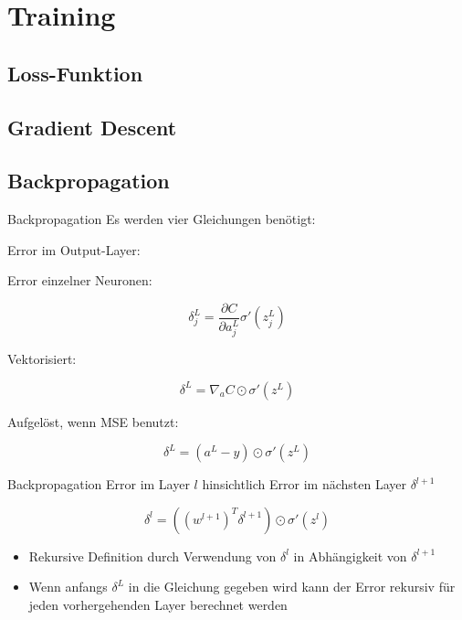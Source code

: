 \section{Training}%
\label{sec:train}

\subsection{Loss-Funktion}%
\label{sec:loss}



\subsection{Gradient Descent}%
\label{sec:graddesc}



\subsection{Backpropagation}%
\label{sec:backprop}

\begin{frame}{Backpropagation}
  Es werden vier Gleichungen benötigt:

  Error im Output-Layer:

  Error einzelner Neuronen:

  \[\delta_j^L = \frac{\partial C}{\partial a_j^L} \sigma' \left(z_j^L\right)\]

  Vektorisiert:

  \[\delta^L = \nabla_aC \odot \sigma'(z^L)\]

  Aufgelöst, wenn MSE benutzt:

  \[\delta^L = (a^L - y) \odot \sigma'(z^L)\]
\end{frame}

\begin{frame}{Backpropagation}
  Error im Layer \(l\) hinsichtlich Error im nächsten Layer \(\delta^{l+1}\)

  \[\delta^l = \left(\left(w^{l+1}\right)^T\delta^{l+1}\right) \odot
    \sigma'\left(z^l\right)\]

  \begin{itemize}
  \item Rekursive Definition durch Verwendung von \(\delta^l\) in Abhängigkeit
    von \(\delta^{l+1}\)
  \item Wenn anfangs \(\delta^L\) in die Gleichung gegeben wird kann der Error
    rekursiv für jeden vorhergehenden Layer berechnet werden
  \end{itemize}
\end{frame}

